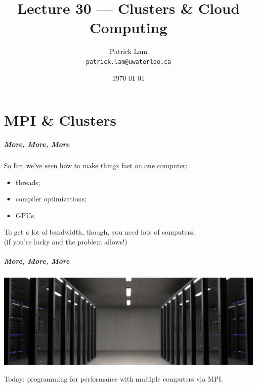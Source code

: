 

\title{Lecture 30 --- Clusters \& Cloud Computing}

\author{Patrick Lam \\ \small \texttt{patrick.lam@uwaterloo.ca}}
\date{\today}




\begin{frame}
  \titlepage

 \end{frame}


\part{MPI \& Clusters}
\frame{\partpage}


\begin{frame}
  \frametitle{More, More, More}

  

  So far, we've seen how to make things fast on one computer:
\begin{itemize}
\item threads;
\item compiler optimizations;
\item GPUs.
\end{itemize}
  To get a lot of bandwidth, though, you need lots of computers, \\
   \qquad (if you're lucky and the problem allows!)\\[1em]
   
\end{frame}


\begin{frame}
  \frametitle{More, More, More}
  
  \begin{center}
	\includegraphics[width= \textwidth]{images/servers.jpeg}
\end{center}

  Today: programming for performance with multiple computers via MPI.

  
\end{frame}

